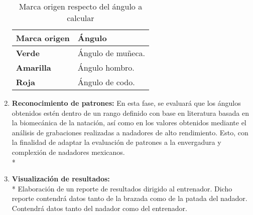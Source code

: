 \begin{enumerate}
\begin{longtable}{ | p{5.5cm} | p{5.5cm} | }
	\caption{Marca origen respecto del ángulo a calcular}
	\label{table:marcaorigen}
	\\	\hline
		 \textbf{Marca origen} &\textbf{Ángulo}
		\\ \hline
        \textbf{Verde}&Ángulo de muñeca.
        \\ \hline
        \textbf{Amarilla}&Ángulo hombro.
        \\ \hline
        \textbf{Roja}&Ángulo de codo.
        \\ \hline
\end{longtable}

    \item \textbf{Reconocimiento de patrones:}
    En esta fase, se evaluará que los ángulos obtenidos estén dentro de un rango 
    definido con base en literatura basada en la biomecánica de la natación, 
    así como en los valores obtenidos mediante el análisis de grabaciones 
    realizadas a nadadores de alto rendimiento. Esto, con la finalidad de adaptar 
    la evaluación de patrones a la envergadura y complexión de nadadores mexicanos.
\\*
    \item \textbf{Visualización de resultados:}
\\*
    Elaboración de un reporte de resultados dirigido al entrenador. Dicho reporte 
    contendrá datos tanto de la brazada como de la patada del nadador.
    Contendrá datos tanto del nadador como del entrenador.
\end{enumerate}